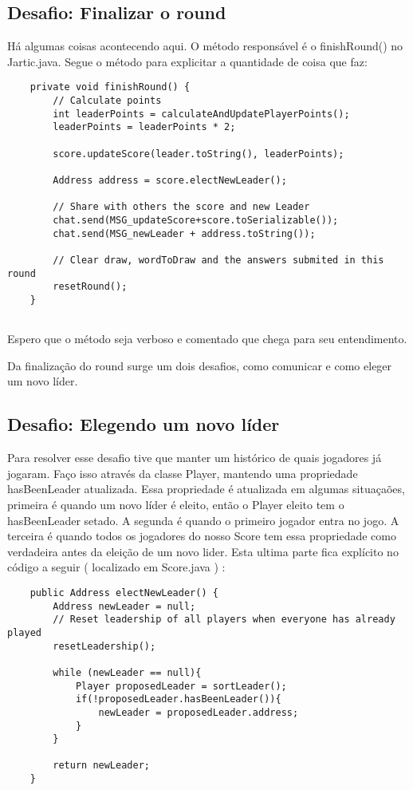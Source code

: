 \documentclass{article}
\begin{document}
 
\subsection{Desafio: Finalizar o round }
Há algumas coisas acontecendo aqui. O método responsável é o finishRound() no Jartic.java.  Segue o método para explicitar a quantidade de coisa que faz:


\begin{lstlisting}    
    private void finishRound() {
        // Calculate points
        int leaderPoints = calculateAndUpdatePlayerPoints();
        leaderPoints = leaderPoints * 2;
        
        score.updateScore(leader.toString(), leaderPoints);
        
        Address address = score.electNewLeader();
        
        // Share with others the score and new Leader
        chat.send(MSG_updateScore+score.toSerializable());
        chat.send(MSG_newLeader + address.toString());
        
        // Clear draw, wordToDraw and the answers submited in this round
        resetRound();
    }
 
\end{lstlisting} 
Espero que o método seja verboso e comentado que chega para seu entendimento.


Da finalização do round surge um dois desafios, como comunicar e como eleger um novo líder.

\subsection{Desafio: Elegendo um novo líder}

Para resolver esse desafio tive que manter um histórico de quais jogadores já jogaram. Faço isso através da classe Player, mantendo uma propriedade hasBeenLeader atualizada. Essa propriedade é atualizada em algumas situaçaões, primeira é quando um novo líder é eleito, então o Player eleito tem o hasBeenLeader setado.
A segunda é quando o primeiro jogador entra no jogo. A terceira é quando todos os jogadores do nosso Score tem essa propriedade como verdadeira antes da eleição de um novo lider. Esta ultima parte fica explícito no código a seguir ( localizado em Score.java ) :
\begin{lstlisting} 
    public Address electNewLeader() {
        Address newLeader = null;
        // Reset leadership of all players when everyone has already played
        resetLeadership();
        
        while (newLeader == null){
            Player proposedLeader = sortLeader();
            if(!proposedLeader.hasBeenLeader()){
                newLeader = proposedLeader.address;
            }
        }
        
        return newLeader;
    }
\end{lstlisting} 
\end{document}
